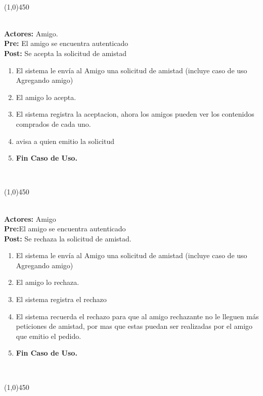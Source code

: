 \documentclass[11pt, a4paper, spanish]{article}
\begin{document}
 \\
\begin{center} \line(1,0){450} \end{center}



 \\
\textbf{Actores:}  Amigo. \\
\textbf{Pre:} El amigo se encuentra autenticado \\
\textbf{Post:} Se acepta la solicitud de amistad\\
\begin{enumerate}
	\item El sistema le envía al Amigo una solicitud de amistad (incluye caso de uso Agregando amigo)
\item El amigo lo acepta.
\item El sistema registra la aceptacion, ahora los amigos pueden ver los contenidos comprados de cada uno.
\item avisa a quien emitio la solicitud
\item \textbf{Fin Caso de Uso.} \\

\end{enumerate}
 \\
\begin{center} \line(1,0){450} \end{center}



	 \\
\textbf{Actores:} Amigo \\
\textbf{Pre:}El amigo se encuentra autenticado \\
\textbf{Post:}  Se rechaza la solicitud de amistad.\\
\begin{enumerate}
	\item El sistema le envía al Amigo una solicitud de amistad (incluye caso de uso Agregando amigo)
\item El amigo lo rechaza.
\item El sistema registra el rechazo
\item El sistema recuerda el rechazo para que al amigo rechazante no le lleguen más peticiones de amistad, por mas que estas puedan ser realizadas por el amigo que emitio el pedido.
\item \textbf{Fin Caso de Uso.} \\

\end{enumerate}
 \\
\begin{center} \line(1,0){450} \end{center}
\end{document}
